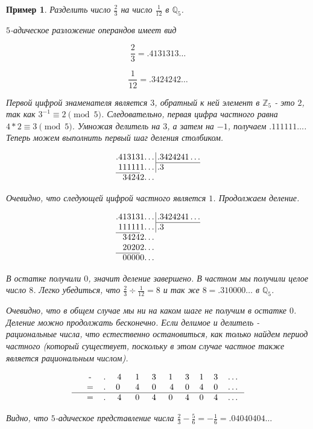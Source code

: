 \documentclass[master, och, diploma, times]{sty/SCWorks}
\theoremstyle{plain}
\newtheorem{exmp}{Пример}[section]
\theoremstyle{definition}
\numberwithin{equation}{section}
\begin{document}
\begin{exmp}
Разделить число $\frac{2}{3}$ на число $\frac{1}{12}$ в $\mathbb{Q}_5$.

\noindent $5$-адическое разложение операндов имеет вид

$$
\frac{2}{3}=.4131313\dots
$$

$$
\frac{1}{12}=.3424242\dots
$$

\noindent Первой цифрой знаменателя является $3$, обратный к ней элемент в $\mathbb{Z}_5$ - это $2$, так как $3^{-1} \equiv 2 \pmod 5$. Следовательно, первая цифра частного равна \mbox{$4*2 \equiv 3 \pmod 5$}. Умножая делитель на $3$, а затем на $-1$, получаем $.111111\dots$. Теперь можем выполнить первый шаг деления столбиком.

$$
\arraycolsep=0.01em
\begin{array}{rrrrrrrr@{\,}r|l}
.&4&1&3&1&3&1&\dots&&\,.3424241\dots\\
\cline{10-10}
&1&1&1&1&1&1&\dots&&\,.3\\
\cline{1-6}
&&3&4&2&4&2&\dots
\end{array}
$$

\noindent Очевидно, что следующей цифрой частного является $1$. Продолжаем деление.

$$
\arraycolsep=0.01em
\begin{array}{rrrrrrrr@{\,}r|l}
.&4&1&3&1&3&1&\dots&&\,.3424241\dots\\
\cline{10-10}
&1&1&1&1&1&1&\dots&&\,.3\\
\cline{1-6}
&&3&4&2&4&2&\dots \\
&&2&0&2&0&2&\dots \\
\cline{1-6}
&&0&0&0&0&0&\dots
\end{array}
$$

\noindent В остатке получили $0$, значит деление завершено. В частном мы получили целое число $8$. Легко убедиться, что $\frac{2}{3} \div \frac{1}{12}=8$ и так же $8=.310000\dots$ в $\mathbb{Q}_5$.

Очевидно, что в общем случае мы ни на каком шаге не получим в остатке $0$. Деление можно продолжать бесконечно. Если делимое и делитель - рациональные числа, что естественно остановиться, как только найдем период частного (который существует, поскольку в этом случае частное также является рациональным числом).

$$
\begin{tabular}{cccccccccccc}
& - & . & 4\; & 1\; & 3\; & 1\; & 3 & 1 & 3 & \dots \\
& = & . & 0 \; & 4\; & 0\; & 4 & 0 & 4 & 0 & \dots \\
\hline
& = & . & 4\; & 0\; & 4\; & 0\; & 4 & 0 & 4 & \dots
\end{tabular}
$$

\noindent Видно, что $5$-адическое представление числа $\frac{2}{3} - \frac{5}{6}=-\frac{1}{6}=.04040404\dots$
\end{exmp}
\end{document}
